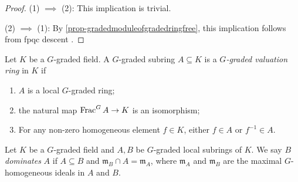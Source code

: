 \begin{proof}
    (1) $\implies$ (2): This implication is trivial.
    
    (2) $\implies$ (1): By \cref{prop-gradedmoduleofgradedringfree}, this implication follows from fpqc descent \cite[\href{https://stacks.math.columbia.edu/tag/02YJ}{Tag 02YJ}]{stacks-project}.
\end{proof}

\begin{definition}
    Let $K$ be a $G$-graded field. A $G$-graded subring $A\subseteq K$ is a \emph{$G$-graded valuation ring} in $K$ if
    \begin{enumerate}
        \item $A$ is a local $G$-graded ring;
        \item the natural map $\operatorname{Frac}^G A\rightarrow K$ is an isomorphism;
        \item For any non-zero homogeneous element $f\in K$, either $f\in A$ or $f^{-1}\in A$.
    \end{enumerate}
\end{definition}

\begin{definition}
    Let $K$ be a $G$-graded field and $A,B$ be $G$-graded local subrings of $K$. We say $B$ \emph{dominates} $A$ if $A\subseteq B$ and $\mathfrak{m}_B\cap A=\mathfrak{m}_A$, where $\mathfrak{m}_A$ and $\mathfrak{m}_B$ are the maximal $G$-homogeneous ideals in $A$ and $B$. 
\end{definition}

